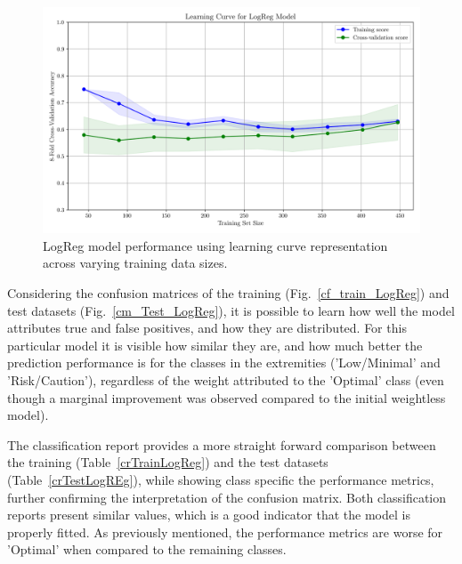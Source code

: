 \documentclass[conference]{IEEEtran}
\begin{document}
\begin{figure}[H]
    \centering
    \includegraphics[width=1\linewidth]{assets/LOGR_lercurve.png}
    \caption{LogReg model performance using learning curve representation across varying training data sizes.}
    \label{lcLogReg}
\end{figure} %

Considering the confusion matrices of the training (Fig.~\ref{cf_train_LogReg}) and test datasets (Fig.~\ref{cm_Test_LogReg}), it is possible to learn how well the model attributes true and false positives, and how they are distributed. For this particular model it is visible how similar they are, and how much better the prediction performance is for the classes in the extremities ('Low/Minimal' and 'Risk/Caution'), regardless of the weight attributed to the 'Optimal' class (even though a marginal improvement was observed compared to the initial weightless model).

The classification report provides a more straight forward comparison between the training (Table~\ref{crTrainLogReg}) and the test datasets (Table~\ref{crTestLogREg}), while showing class specific the performance metrics, further confirming the interpretation of the confusion matrix. Both classification reports present similar values, which is a good indicator that the model is properly fitted. As previously mentioned, the performance metrics are worse for 'Optimal' when compared to the remaining classes.
\end{document}
